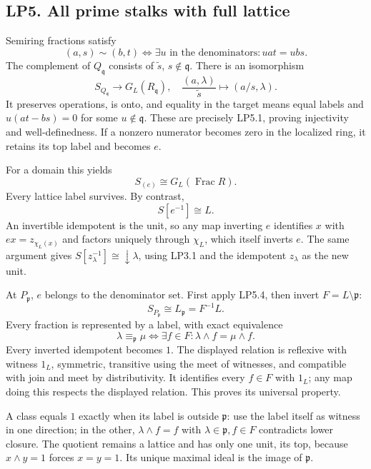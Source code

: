 \subsection{LP5. All prime stalks with full
lattice}\label{lp5.-all-prime-stalks-with-full-lattice}

Semiring fractions satisfy \[
(a,s)\sim(b,t)\iff\exists u\text{ in the denominators}:uat=ubs.
\tag{LP5.1}
\] The complement of \(Q_{\mathfrak q}\) consists of \(\widetilde s\),
\(s\notin\mathfrak q\). There is an isomorphism \[
S_{Q_{\mathfrak q}}\longrightarrow G_L(R_{\mathfrak q}),\quad
\frac{(a,\lambda)}{\widetilde s}\mapsto(a/s,\lambda).
\tag{LP5.2}
\] It preserves operations, is onto, and equality in the target means
equal labels and \(u(at-bs)=0\) for some \(u\notin\mathfrak q\). These
are precisely LP5.1, proving injectivity and well-definedness. If a
nonzero numerator becomes zero in the localized ring, it retains its top
label and becomes \(e\).

For a domain this yields \[
\boxed{S_{(e)}\cong G_L(\operatorname{Frac}R).}
\tag{LP5.3}
\] Every lattice label survives. By contrast, \[
\boxed{S[e^{-1}]\cong L.}
\tag{LP5.4}
\] An invertible idempotent is the unit, so any map inverting \(e\)
identifies \(x\) with \(ex=z_{\chi_L(x)}\) and factors uniquely through
\(\chi_L\), which itself inverts \(e\). The same argument gives
\(S[z_\lambda^{-1}]\cong\downarrow\lambda\), using LP3.1 and the
idempotent \(z_\lambda\) as the new unit.

At \(P_{\mathfrak p}\), \(e\) belongs to the denominator set. First
apply LP5.4, then invert \(F=L\setminus\mathfrak p\): \[
\boxed{S_{P_{\mathfrak p}}\cong L_{\mathfrak p}=F^{-1}L.}
\tag{LP5.5}
\] Every fraction is represented by a label, with exact equivalence \[
\lambda\equiv_{\mathfrak p}\mu
\iff\exists f\in F:\lambda\wedge f=\mu\wedge f.
\tag{LP5.6}
\] Every inverted idempotent becomes \(1\). The displayed relation is
reflexive with witness \(1_L\), symmetric, transitive using the meet of
witnesses, and compatible with join and meet by distributivity. It
identifies every \(f\in F\) with \(1_L\); any map doing this respects
the displayed relation. This proves its universal property.

A class equals \(1\) exactly when its label is outside \(\mathfrak p\):
use the label itself as witness in one direction; in the other,
\(\lambda\wedge f=f\) with \(\lambda\in\mathfrak p,f\in F\) contradicts
lower closure. The quotient remains a lattice and has only one unit, its
top, because \(x\wedge y=1\) forces \(x=y=1\). Its unique maximal ideal
is the image of \(\mathfrak p\).

